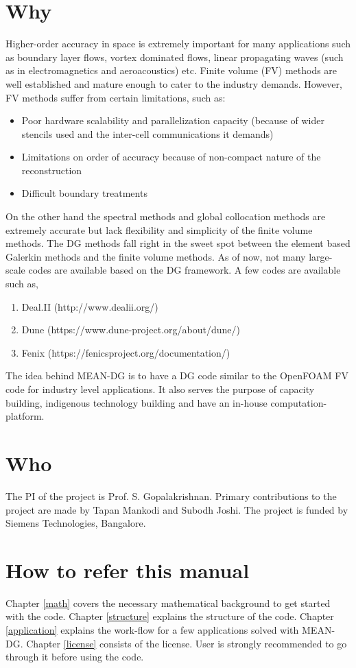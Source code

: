 \section{Why}
Higher-order accuracy in space is extremely important for many applications such as boundary layer flows, vortex dominated
flows, linear propagating waves (such as in electromagnetics and aeroacoustics) etc. Finite volume (FV) methods are well established
and mature enough to cater to the industry demands. However, FV methods suffer from certain limitations, such as:
\begin{itemize}
\item Poor hardware scalability and parallelization capacity (because of wider stencils used and the inter-cell communications it demands) 
\item Limitations on order of accuracy because of non-compact nature of the reconstruction
\item Difficult boundary treatments
\end{itemize}
On the other hand the spectral methods and global collocation methods are extremely accurate but lack flexibility and 
simplicity of the finite volume methods. The DG methods fall right in the sweet spot between the element based Galerkin methods
and the finite volume methods. As of now, not many large-scale codes are available based on the DG framework. A few codes are 
available such as,
\begin{enumerate}
\item Deal.II (http://www.dealii.org/) 
\item Dune (https://www.dune-project.org/about/dune/) 
\item Fenix (https://fenicsproject.org/documentation/) 
\end{enumerate}
The idea behind MEAN-DG is to have a DG code similar to the OpenFOAM FV code for industry level applications. 
It also serves the purpose of capacity building, indigenous technology building and have an in-house computation-platform.

\section{Who}
The PI of the project is Prof. S. Gopalakrishnan. Primary contributions to the project are made by Tapan Mankodi and Subodh Joshi.
The project is funded by Siemens Technologies, Bangalore. 

\section{How {\small {to refer this manual}}}
Chapter \ref{math} covers the necessary mathematical background to get started with the code. Chapter \ref{structure} explains
the structure of the code. Chapter \ref{application} explains the work-flow for a few applications solved with MEAN-DG. 
Chapter \ref{license} consists of the license. User is strongly recommended to go through it before using the code.

